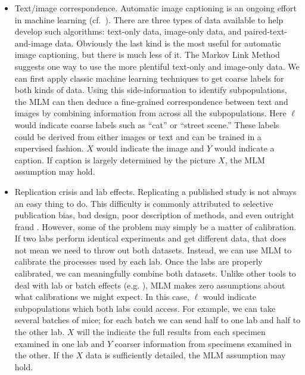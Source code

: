\begin{itemize}
    \item Text/image correspondence.  Automatic image captioning is an ongoing effort in machine learning (cf.\ \cite{srivastava2018survey}).  There are three types of data available to help develop such algorithms: text-only data, image-only data, and paired-text-and-image data.  Obviously the last kind is the most useful for automatic image captioning, but there is much less of it.  The Markov Link Method suggests one way to use the more plentiful text-only and image-only data.  We can first apply classic machine learning techniques to get coarse labels for both kinds of data.  Using this side-information to identify subpopulations, the MLM can then deduce a fine-grained correspondence between text and images by combining information from across all the subpopulations.  Here $\ell$ would indicate coarse labels such as ``cat'' or ``street scene.''  These labels could be derived from either images or text and can be trained in a supervised fashion.  $X$ would indicate the image and $Y$ would indicate a caption.  If caption is largely determined by the picture $X$, the MLM assumption may hold.  

    \item Replication crisis and lab effects.  Replicating a published study is not always an easy thing to do.  This difficulty is commonly attributed to selective publication bias, bad design, poor description of methods, and even outright fraud \cite{baker2016reproducibility}.  However, some of the problem may simply be a matter of calibration.  If two labs perform identical experiments and get different data, that does not mean we need to throw out both datasets.  Instead, we can use MLM to calibrate the processes used by each lab.  Once the labs are properly calibrated, we can meaningfully combine both datasets.  Unlike other tools to deal with lab or batch effects (e.g. \cite{crow2018characterizing,johnson2007adjusting}), MLM makes zero assumptions about what calibrations we might expect.  In this case, $\ell$ would indicate subpopulations which both labs could access.  For example, we can take several batches of mice; for each batch we can send half to one lab and half to the other lab.  $X$ will the indicate the full results from each specimen examined in one lab and $Y$ coarser information from specimens examined in the other.  If the $X$ data is sufficiently detailed, the MLM assumption may hold.  
\end{itemize}

